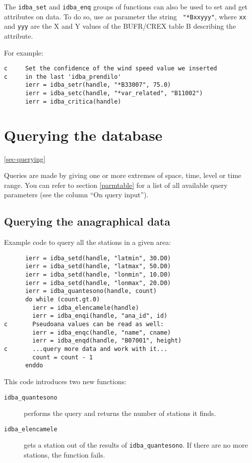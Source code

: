 \documentclass[final,12pt,a4paper,twoside]{book}
\begin{document}
\label{sec-attrs}

The {\tt idba\_set} and {\tt idba\_enq} groups of functions can also be used to
set and get attributes on data.  To do so, use as parameter the string {\tt
"*Bxxyyy"}, where {\tt xx} and {\tt yyy} are the X and Y values of the
BUFR/CREX table B describing the attribute.

For example:

\begin{verbatim}
c     Set the confidence of the wind speed value we inserted
c     in the last 'idba_prendilo'
      ierr = idba_setr(handle, "*B33007", 75.0)
      ierr = idba_setc(handle, "*var_related", "B11002")
      ierr = idba_critica(handle)
\end{verbatim}

\section {Querying the database}

\ref{sec-querying}

Queries are made by giving one or more extremes of space, time, level or time
range.  You can refer to section \ref{parmtable} for a list of all available
query parameters (see the column ``On query input'').

\subsection {Querying the anagraphical data}

Example code to query all the stations in a given area:
\label{fun-idba_quantesono}
\label{fun-idba_elencamele}

\begin{verbatim}
      ierr = idba_setd(handle, "latmin", 30.D0)
      ierr = idba_setd(handle, "latmax", 50.D0)
      ierr = idba_setd(handle, "lonmin", 10.D0)
      ierr = idba_setd(handle, "lonmax", 20.D0)
      ierr = idba_quantesono(handle, count)
      do while (count.gt.0)
        ierr = idba_elencamele(handle)
        ierr = idba_enqi(handle, "ana_id", id)
c       Pseudoana values can be read as well:
        ierr = idba_enqc(handle, "name", cname)
        ierr = idba_enqd(handle, "B07001", height)
c       ...query more data and work with it...
        count = count - 1
      enddo
\end{verbatim}

This code introduces two new functions:

\begin{description}
\item[{\tt idba\_quantesono}]
  performs the query and returns the number of stations it finds.

\item[{\tt idba\_elencamele}]
  gets a station out of the results of {\tt idba\_quantesono}.  If there are no
  more stations, the function fails.
\end{description}
\end{document}
